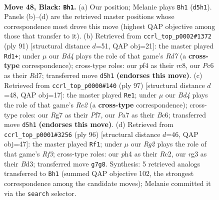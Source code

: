 \documentclass[11pt]{article}
\begin{document}
\clearpage

\begin{figure}[p]\centering
\begin{subfigure}{0.46\textwidth}\centering
\resizebox{\linewidth}{!}{%
\newchessgame
\chessboard[
  setfen={2r5/p1p1k1r1/P1p3p1/2Pb1p1p/1P3P1P/6R1/5K2/RN6 b - - 19 48},
  showmover=false,
  pgfstyle=straightmove, color=movearrow, markmove={d5-h1}
]}
\caption{}
\end{subfigure}\hfill
\begin{subfigure}{0.46\textwidth}\centering
\resizebox{\linewidth}{!}{%
\newchessgame
\chessboard[
  setfen={1RR5/3r1p1k/p3pP1p/1p4pP/6P1/1P6/P2r4/5K2 b - - 13 46},
  showmover=false,
  pgfstyle=straightmove, color=movearrow, markmove={d2-d1}
]}
\caption{}
\end{subfigure}
\\[4pt]
\begin{subfigure}{0.46\textwidth}\centering
\resizebox{\linewidth}{!}{%
\newchessgame
\chessboard[
  setfen={8/1p2rp2/p1b2k2/P4p1p/2P2R2/1PNK2PP/8/8 b - - 28 49},
  showmover=false,
  pgfstyle=straightmove, color=movearrow, markmove={e7-e1}
]}
\caption{}
\end{subfigure}\hfill
\begin{subfigure}{0.46\textwidth}\centering
\resizebox{\linewidth}{!}{%
\newchessgame
\chessboard[
  setfen={3k1r2/8/1p1nr1p1/p2p2Pp/P4P1P/KP1B1R2/2R5/8 w - - 2 49},
  showmover=false,
  pgfstyle=straightmove, color=movearrow, markmove={f3-f1}
]}
\caption{}
\end{subfigure}
\caption{\textbf{Move 48, Black: \texttt{Bh1}.} (a) Our position; Melanie plays \texttt{Bh1} (\texttt{d5h1}). Panels (b)--(d) are the retrieved master positions whose correspondence most drove this move (highest QAP objective among those that transfer to it). (b) Retrieved from \texttt{ccrl\_top\_p0002\#1372} (ply 91) [structural distance $d$=51, QAP obj=21]: the master played \texttt{Rd1+}; under $\mu$ our \emph{Bd4} plays the role of that game's \emph{Rd7} (a \textbf{cross-type} correspondence); cross-type roles: our \emph{p}f4 as their \emph{r}c8, our \emph{P}c6 as their \emph{R}d7; transferred move \texttt{d5h1} \textbf{(endorses this move)}. (c) Retrieved from \texttt{ccrl\_top\_p0000\#140} (ply 97) [structural distance $d$=48, QAP obj=17]: the master played \texttt{Re1}; under $\mu$ our \emph{Bd4} plays the role of that game's \emph{Re2} (a \textbf{cross-type} correspondence); cross-type roles: our \emph{R}g7 as their \emph{P}f7, our \emph{P}a7 as their \emph{B}c6; transferred move \texttt{d5h1} \textbf{(endorses this move)}. (d) Retrieved from \texttt{ccrl\_top\_p0001\#3256} (ply 96) [structural distance $d$=46, QAP obj=47]: the master played \texttt{Rf1}; under $\mu$ our \emph{Rg2} plays the role of that game's \emph{Rf3}; cross-type roles: our \emph{p}h4 as their \emph{R}c2, our \emph{r}g3 as their \emph{B}d3; transferred move \texttt{g7g8}. Synthesis: 5 retrieved analogs transferred to \texttt{Bh1} (summed QAP objective 102, the strongest correspondence among the candidate moves); Melanie committed it via the \texttt{search} selector.}
\label{fig:thought-m95}
\end{figure}
\end{document}

